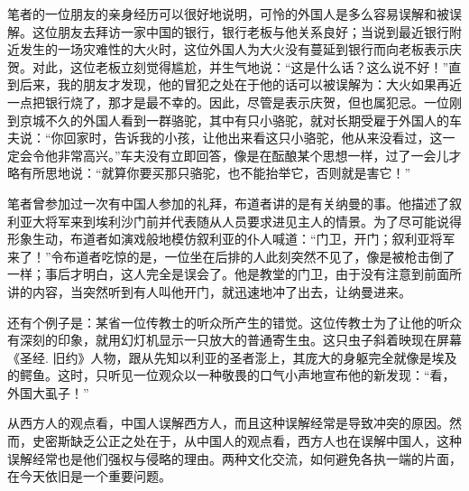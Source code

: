 \documentclass[12pt,oneside]{book}
\begin{document}
\begin{common-format}
笔者的一位朋友的亲身经历可以很好地说明，可怜的外国人是多么容易误解和被误解。这位朋友去拜访一家中国的银行，银行老板与他关系良好；当说到最近银行附近发生的一场灾难性的大火时，这位外国人为大火没有蔓延到银行而向老板表示庆贺。对此，这位老板立刻觉得尴尬，并生气地说：“这是什么话？这么说不好！”直到后来，我的朋友才发现，他的冒犯之处在于他的话可以被误解为：大火如果再近一点把银行烧了，那才是最不幸的。因此，尽管是表示庆贺，但也属犯忌。一位刚到京城不久的外国人看到一群骆驼，其中有只小骆驼，就对长期受雇于外国人的车夫说：“你回家时，告诉我的小孩，让他出来看这只小骆驼，他从来没看过，这一定会令他非常高兴。”车夫没有立即回答，像是在酝酿某个思想一样，过了一会儿才略有所思地说：“就算你要买那只骆驼，也不能抬举它，否则就是害它！” 

笔者曾参加过一次有中国人参加的礼拜，布道者讲的是有关纳曼的事。他描述了叙利亚大将军来到埃利沙门前并代表随从人员要求进见主人的情景。为了尽可能说得形象生动，布道者如演戏般地模仿叙利亚的仆人喊道：“门卫，开门；叙利亚将军来了！”令布道者吃惊的是，一位坐在后排的人此刻突然不见了，像是被枪击倒了一样；事后才明白，这人完全是误会了。他是教堂的门卫，由于没有注意到前面所讲的内容，当突然听到有人叫他开门，就迅速地冲了出去，让纳曼进来。 

还有个例子是：某省一位传教士的听众所产生的错觉。这位传教士为了让他的听众有深刻的印象，就用幻灯机显示一只放大的普通寄生虫。这只虫子斜着映现在屏幕《圣经. 旧约》人物，跟从先知以利亚的圣者澎上，其庞大的身躯完全就像是埃及的鳄鱼。这时，只听见一位观众以一种敬畏的口气小声地宣布他的新发现：“看，外国大虱子！” 

从西方人的观点看，中国人误解西方人，而且这种误解经常是导致冲突的原因。然而，史密斯缺乏公正之处在于，从中国人的观点看，西方人也在误解中国人，这种误解经常也是他们强权与侵略的理由。两种文化交流，如何避免各执一端的片面，在今天依旧是一个重要问题。




\end{common-format}
\end{document}
